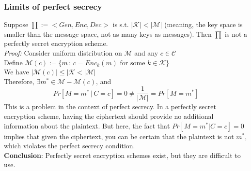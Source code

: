\documentclass[12pt]{article}   	%
\begin{document}
\subsubsection{Limits of perfect secrecy}
Suppose $\prod:=<Gen,Enc,Dec>$ is s.t. $|\mathcal{K}| < |\mathcal{M}|$ (meaning, the key space is smaller than the message space, not as many keys as messages). Then $\prod$ is not a perfectly secret encryption scheme.\\
\emph{Proof:} Consider uniform distribution on $\mathcal{M}$ and any $c \in \mathcal{C}$\\
Define $\mathcal{M}(c):=\{m\,:\,c=Enc_k(m) \text{ for some } k \in \mathcal{K}\}$\\
We have $|\mathcal{M}(c)| \le |\mathcal{K} < |\mathcal{M}|$\\
Therefore, $\exists m^* \in \mathcal{M} - \mathcal{M}(c)$, and
\begin{equation}
Pr[M=m^*\,|\,C=c]=0 \neq \frac{1}{|\mathcal{M}|} = Pr[M=m^*]
\end{equation}
This is a problem in the context of perfect secrecy. In a perfectly secret encryption scheme, having the ciphertext should provide no additional information about the plaintext. But here, the fact that $Pr[M=m^*|C=c]=0$ implies that given the ciphertext, you can be certain that the plaintext is not $m^*$, which violates the perfect secrecy condition.\\
\textbf{Conclusion}: Perfectly secret encryption schemes exist, but they are difficult to use.
\end{document}
